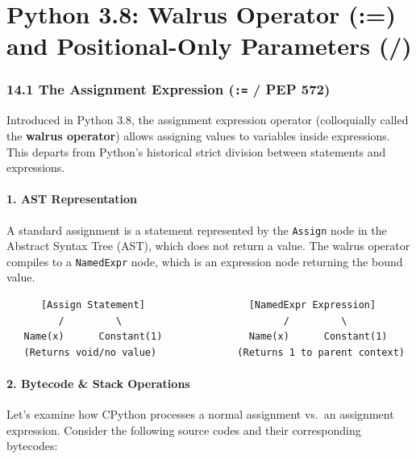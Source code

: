\hypertarget{python-3.8-walrus-operator-and-positional-only-parameters}{%
\chapter{Python 3.8: Walrus Operator (:=) and Positional-Only Parameters
(/)}\label{python-3.8-walrus-operator-and-positional-only-parameters}}

\hypertarget{the-assignment-expression-pep-572}{%
\subsection{\texorpdfstring{14.1 The Assignment Expression (\texttt{:=}
/ PEP
572)}{14.1 The Assignment Expression (:= / PEP 572)}}\label{the-assignment-expression-pep-572}}

Introduced in Python 3.8, the assignment expression operator
(colloquially called the \textbf{walrus operator}) allows assigning
values to variables inside expressions. This departs from Python's
historical strict division between statements and expressions.

\hypertarget{ast-representation}{%
\subsubsection{1. AST Representation}\label{ast-representation}}

A standard assignment is a statement represented by the
\passthrough{\lstinline!Assign!} node in the Abstract Syntax Tree (AST),
which does not return a value. The walrus operator compiles to a
\passthrough{\lstinline!NamedExpr!} node, which is an expression node
returning the bound value.

\begin{lstlisting}
      [Assign Statement]                  [NamedExpr Expression]
         /         \                            /         \
   Name(x)      Constant(1)               Name(x)      Constant(1)
   (Returns void/no value)              (Returns 1 to parent context)
\end{lstlisting}

\hypertarget{bytecode-stack-operations}{%
\subsubsection{2. Bytecode \& Stack
Operations}\label{bytecode-stack-operations}}

Let's examine how CPython processes a normal assignment vs.~an
assignment expression. Consider the following source codes and their
corresponding bytecodes:

